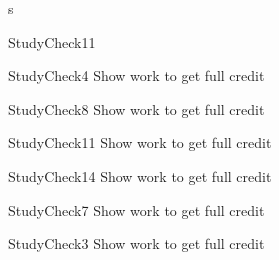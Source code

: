 \documentclass[a4paper,8pt]{book}
\begin{document}
\begin{exam}{s}
\begin{verA}
%
\begin{problem*}{StudyCheck11}\vspace{1cm}  
\begin{solution}[1.0in]\end{solution}
\end{problem*}

 
 \begin{problem*}{StudyCheck4}{ Show work to get full credit}\vspace{1cm}  
\begin{solution}[1.0in]\end{solution}
\end{problem*}
 
 \begin{problem*}{StudyCheck8}{ Show work to get full credit}\vspace{1cm}  
\begin{solution}[1.0in]\end{solution}
\end{problem*}
 
 \begin{problem*}{StudyCheck11}{ Show work to get full credit}\vspace{1cm}  
\begin{solution}[1.0in]\end{solution}
\end{problem*}
 
 \begin{problem*}{StudyCheck14}{ Show work to get full credit}\vspace{1cm}  
\begin{solution}[1.0in]\end{solution}
\end{problem*}


 
 \begin{problem*}{StudyCheck7}{ Show work to get full credit}\vspace{1cm}  
\begin{solution}[1.0in]\end{solution}
\end{problem*}
 
 
 \begin{problem*}{StudyCheck3}{ Show work to get full credit}\vspace{1cm}  
\begin{solution}[1.0in]\end{solution}
\end{problem*}
 

\end{verA}
\end{exam}
\end{document}
